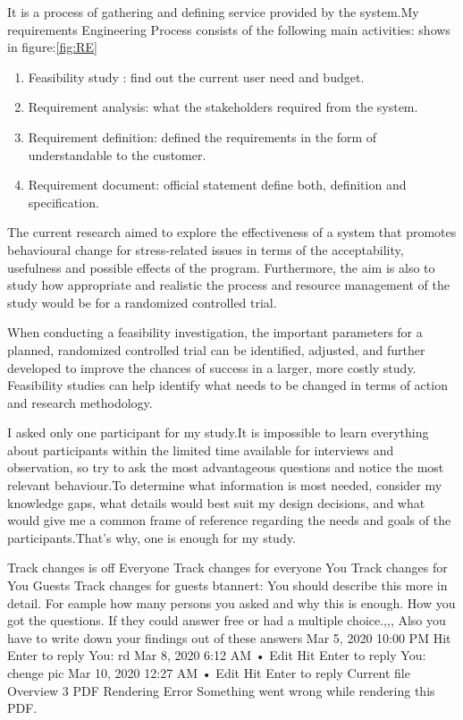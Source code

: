 It is a process of gathering and defining service provided by the system.My requirements Engineering Process consists of the following main activities: shows in figure:\ref{fig:RE}

\begin{enumerate}
    \item  Feasibility study : find out the current user need and budget.
    \item Requirement analysis: what the stakeholders required from the system.
    \item Requirement definition: defined the requirements in the form of understandable to the customer.
    \item Requirement document: official statement define both, definition and specification.
\end{enumerate}

The current research aimed to explore the effectiveness of a system that promotes behavioural change for stress-related issues in terms of the acceptability, usefulness and possible effects of the program. Furthermore, the aim is also to study how appropriate and realistic the process and resource management of the study would be for a randomized controlled trial. \citep{Eklund2018EvaluationStudy}

When conducting a feasibility investigation, the important parameters for a planned, randomized controlled trial can be identified, adjusted, and further developed to improve the chances of success in a larger, more costly study. Feasibility studies can help identify what needs to be changed in terms of action and research methodology. 

I asked only one participant for my study.It is impossible to learn everything about participants within the limited time available for interviews and observation, so try to ask the most advantageous questions and notice the most relevant behaviour.To determine what information is most needed, consider my knowledge gaps, what details would best suit my design decisions, and what would give me a common frame of reference regarding the needs and goals of the participants.That's why, one is enough for my study.
 
Track changes is off
Everyone
Track changes for everyone
You
Track changes for You
Guests
Track changes for guests
btannert: You should describe this more in detail. For eample how many persons you asked and why this is enough. How you got the questions. If they could answer free or had a multiple choice.,,, Also you have to write down your findings out of these answers
Mar 5, 2020 10:00 PM
Hit Enter to reply
You: rd
Mar 8, 2020 6:12 AM • Edit
Hit Enter to reply
You: chenge pic
Mar 10, 2020 12:27 AM • Edit
Hit Enter to reply
Current file
Overview
3
PDF Rendering Error Something went wrong while rendering this PDF.

